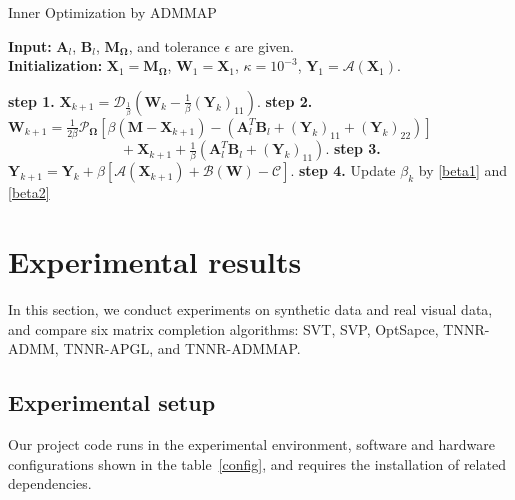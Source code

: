 \documentclass{article}
\begin{document}
{\begin{algorithm}[t]
    \caption{Inner Optimization by ADMMAP}
    \label{algo4}
    \textbf{Input:} $\mathbf A_l$, $\mathbf B_l$, $\mathbf M_{\mathbf\Omega}$, and tolerance $\epsilon$ are given.\\
    \textbf{Initialization:} $\mathbf X_1 = \mathbf M_{\mathbf\Omega}$, $\mathbf W_1=\mathbf X_1$,  $\kappa = 10^{-3}$, $\mathbf Y_1= \mathcal{A}(\mathbf X_1)$.
    \begin{algorithmic}
        \Repeat 
        \State \textbf{step 1.} $\mathbf X_{k+1} = \mathcal{D}_{\frac{1}{\beta}}\left(\mathbf W_k - \frac{1}{\beta}(\mathbf Y_k)_{11}\right)$.
        \State \textbf{step 2.} $\mathbf W_{k+1} = \frac{1}{2\beta} \mathcal{P}_{\mathbf\Omega} [\beta(\mathbf M-\mathbf X_{k+1}) - (\mathbf A_l^T\mathbf B_l + (\mathbf Y_k)_{11}+ (\mathbf Y_k)_{22})]$ \\
        $ \quad\quad\quad\quad\quad\quad\quad\quad+ \mathbf X_{k+1} +  \frac{1}{\beta}(\mathbf A_l^T\mathbf B_l + (\mathbf Y_k)_{11})$.
        \State \textbf{step 3.} $\mathbf Y_{k+1} = \mathbf Y_{k}+\beta[\mathcal{A}(\mathbf X_{k+1})+\mathcal{B}(\mathbf W)-\mathcal{C}]$.
        \State \textbf{step 4.} Update $\beta_k$ by \eqref{beta1} and \eqref{beta2}
    \end{algorithmic}
\end{algorithm}



\section{Experimental results}
\label{s4}

In this section, we conduct experiments on synthetic data and real visual data, and compare six matrix completion algorithms: SVT, SVP, OptSapce, TNNR-ADMM, TNNR-APGL, and TNNR-ADMMAP.


\subsection{Experimental setup}

Our project code runs in the experimental environment, software and hardware configurations shown in the table~\ref{config}, and requires the installation of related dependencies.

}
\end{document}
